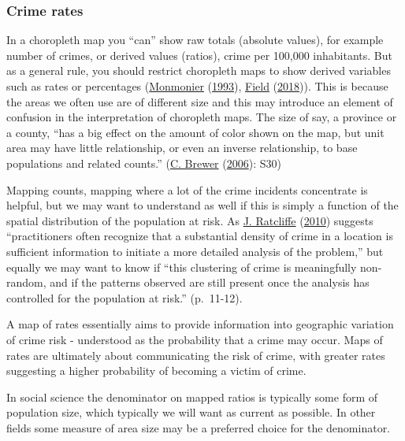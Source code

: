 \documentclass[
]{book}
\begin{document}
\hypertarget{crime-rates}{%
\subsubsection{Crime rates}\label{crime-rates}}

In a choropleth map you ``can'' show raw totals (absolute values), for example number of crimes, or derived values (ratios), crime per 100,000 inhabitants. But as a general rule, you should restrict choropleth maps to show derived variables such as rates or percentages (\protect\hyperlink{ref-Monmonier_1993}{Monmonier} (\protect\hyperlink{ref-Monmonier_1993}{1993}), \protect\hyperlink{ref-Field_2018}{Field} (\protect\hyperlink{ref-Field_2018}{2018})). This is because the areas we often use are of different size and this may introduce an element of confusion in the interpretation of choropleth maps. The size of say, a province or a county, ``has a big effect on the amount of color shown on the map, but unit area may have little relationship, or even an inverse relationship, to base populations and related counts.'' (\protect\hyperlink{ref-Brewer_2006}{C. Brewer} (\protect\hyperlink{ref-Brewer_2006}{2006}): S30)

Mapping counts, mapping where a lot of the crime incidents concentrate is helpful, but we may want to understand as well if this is simply a function of the spatial distribution of the population at risk. As \protect\hyperlink{ref-Ratcliffe_2010}{J. Ratcliffe} (\protect\hyperlink{ref-Ratcliffe_2010}{2010}) suggests ``practitioners often recognize that a substantial density of crime in a location is sufficient information to initiate a more detailed analysis of the problem,'' but equally we may want to know if ``this clustering of crime is meaningfully non-random, and if the patterns observed are still present once the analysis has controlled for the population at risk.'' (p.~11-12).

A map of rates essentially aims to provide information into geographic variation of crime risk - understood as the probability that a crime may occur. Maps of rates are ultimately about communicating the risk of crime, with greater rates suggesting a higher probability of becoming a victim of crime.

In social science the denominator on mapped ratios is typically some form of population size, which typically we will want as current as possible. In other fields some measure of area size may be a preferred choice for the denominator.
\end{document}
